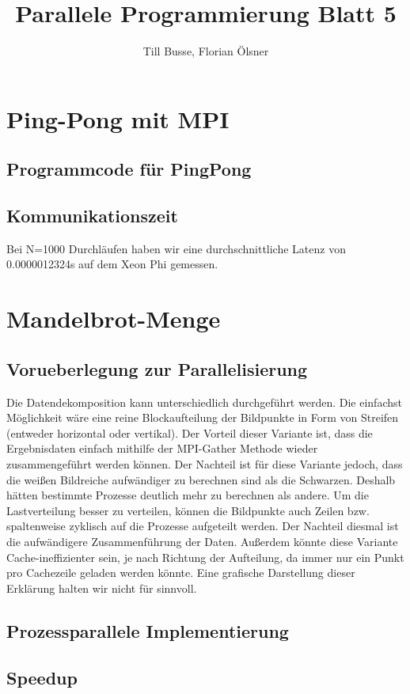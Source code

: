 \documentclass[12pt,a4paper]{article}
\author{Till Busse, Florian Ölsner}
\title{Parallele Programmierung Blatt 5}
\begin{document}
\maketitle
\pagebreak
\section{Ping-Pong mit MPI}
\subsection{Programmcode für PingPong}

\subsection{Kommunikationszeit}
Bei N=1000 Durchläufen haben wir eine durchschnittliche Latenz von 0.0000012324s auf dem Xeon Phi gemessen.
\section{Mandelbrot-Menge}
\subsection{Vorueberlegung zur Parallelisierung}
Die Datendekomposition kann unterschiedlich durchgeführt werden. Die einfachst Möglichkeit wäre eine reine Blockaufteilung der Bildpunkte in Form von Streifen (entweder horizontal oder vertikal). Der Vorteil dieser Variante ist, dass die Ergebnisdaten einfach mithilfe der MPI-Gather Methode wieder zusammengeführt werden können. Der Nachteil ist für diese Variante jedoch, dass die weißen Bildreiche aufwändiger zu berechnen sind als die Schwarzen. Deshalb hätten bestimmte Prozesse deutlich mehr zu berechnen als andere. Um die Lastverteilung besser zu verteilen, können die Bildpunkte auch Zeilen bzw. spaltenweise zyklisch auf die Prozesse aufgeteilt werden. Der Nachteil diesmal ist die aufwändigere Zusammenführung der Daten. Außerdem könnte diese Variante Cache-ineffizienter sein, je nach Richtung der Aufteilung, da immer nur ein Punkt pro Cachezeile geladen werden könnte. Eine grafische Darstellung dieser Erklärung halten wir nicht für sinnvoll.
\subsection{Prozessparallele Implementierung}

\subsection{Speedup}

\end{document}
